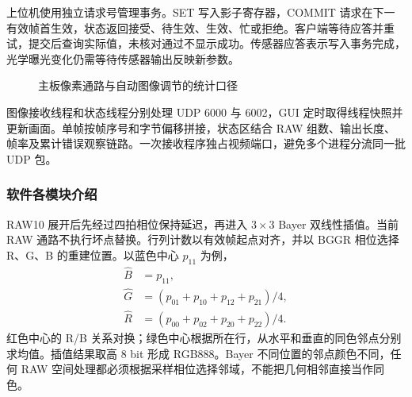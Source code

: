 上位机使用独立请求号管理事务。SET 写入影子寄存器，COMMIT 请求在下一有效帧首生效，状态返回接受、待生效、生效、忙或拒绝。客户端等待应答并重试，提交后查询实际值，未核对通过不显示成功。传感器应答表示写入事务完成，光学曝光变化仍需等待传感器输出反映新参数。

\begin{figure}[htbp]\centering
{}
\caption{主板像素通路与自动图像调节的统计口径}\label{fig:isp}
\end{figure}

图像接收线程和状态线程分别处理 UDP 6000 与 6002，GUI 定时取得线程快照并更新画面。单帧按帧序号和字节偏移拼接，状态区结合 RAW 组数、输出长度、帧率及累计错误观察链路。一次接收程序独占视频端口，避免多个进程分流同一批 UDP 包。

\subsubsection{软件各模块介绍}
RAW10 展开后先经过四拍相位保持延迟，再进入 $3\times3$ Bayer 双线性插值。当前 RAW 通路不执行坏点替换。行列计数以有效帧起点对齐，并以 BGGR 相位选择 R、G、B 的重建位置。以蓝色中心 $p_{11}$ 为例，
\begin{align}
\widehat B&=p_{11},\\
\widehat G&=(p_{01}+p_{10}+p_{12}+p_{21})/4,\\
\widehat R&=(p_{00}+p_{02}+p_{20}+p_{22})/4.
\end{align}
红色中心的 R/B 关系对换；绿色中心根据所在行，从水平和垂直的同色邻点分别求均值。插值结果取高 8 bit 形成 RGB888。Bayer 不同位置的邻点颜色不同，任何 RAW 空间处理都必须根据采样相位选择邻域，不能把几何相邻直接当作同色。\cite{rtl}

